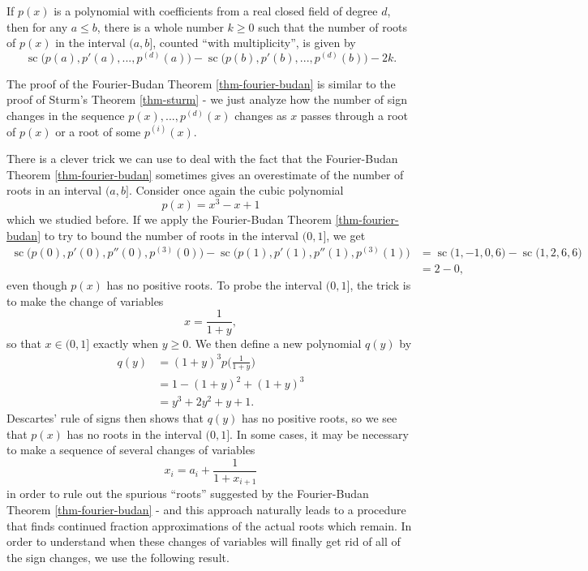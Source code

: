 \begin{thm}\label{thm-fourier-budan} If $p(x)$ is a polynomial with coefficients from a real closed field of degree $d$, then for any $a \le b$, there is a whole number $k \ge 0$ such that the number of roots of $p(x)$ in the interval $(a,b]$, counted ``with multiplicity'', is given by
\[
\operatorname{sc}\big(p(a), p'(a), ..., p^{(d)}(a)\big) - \operatorname{sc}\big(p(b), p'(b), ..., p^{(d)}(b)\big) - 2k.
\]
\end{thm}

The proof of the Fourier-Budan Theorem \ref{thm-fourier-budan} is similar to the proof of Sturm's Theorem \ref{thm-sturm} - we just analyze how the number of sign changes in the sequence $p(x), ..., p^{(d)}(x)$ changes as $x$ passes through a root of $p(x)$ or a root of some $p^{(i)}(x)$.

There is a clever trick we can use to deal with the fact that the Fourier-Budan Theorem \ref{thm-fourier-budan} sometimes gives an overestimate of the number of roots in an interval $(a,b]$. Consider once again the cubic polynomial
\[
p(x) = x^3 - x + 1
\]
which we studied before. If we apply the Fourier-Budan Theorem \ref{thm-fourier-budan} to try to bound the number of roots in the interval $(0,1]$, we get
\begin{align*}
\operatorname{sc}\big(p(0), p'(0), p''(0), p^{(3)}(0)\big) - \operatorname{sc}\big(p(1), p'(1), p''(1), p^{(3)}(1)\big) &= \operatorname{sc}\big(1, -1, 0, 6\big) - \operatorname{sc}\big(1, 2, 6, 6\big)\\
&= 2 - 0,
\end{align*}
even though $p(x)$ has no positive roots. To probe the interval $(0,1]$, the trick is to make the change of variables
\[
x = \frac{1}{1+y},
\]
so that $x \in (0,1]$ exactly when $y \ge 0$. We then define a new polynomial $q(y)$ by
\begin{align*}
q(y) &= (1+y)^3 p\Big(\frac{1}{1+y}\Big)\\
&= 1 - (1+y)^2 + (1+y)^3\\
&= y^3 + 2y^2 + y + 1.
\end{align*}
Descartes' rule of signs then shows that $q(y)$ has no positive roots, so we see that $p(x)$ has no roots in the interval $(0,1]$. In some cases, it may be necessary to make a sequence of several changes of variables
\[
x_i = a_i + \frac{1}{1 + x_{i+1}}
\]
in order to rule out the spurious ``roots'' suggested by the Fourier-Budan Theorem \ref{thm-fourier-budan} - and this approach naturally leads to a procedure that finds continued fraction approximations of the actual roots which remain. In order to understand when these changes of variables will finally get rid of all of the sign changes, we use the following result.

